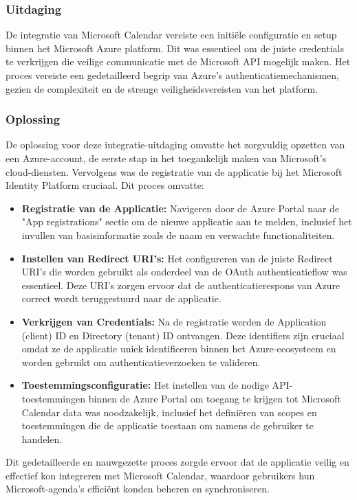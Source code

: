 \subsubsection{Uitdaging}
De integratie van Microsoft Calendar vereiste een initiële configuratie en setup binnen het Microsoft Azure platform. Dit was essentieel om de juiste credentials te verkrijgen die veilige communicatie met de Microsoft API mogelijk maken. Het proces vereiste een gedetailleerd begrip van Azure's authenticatiemechanismen, gezien de complexiteit en de strenge veiligheidsvereisten van het platform.

\subsubsection{Oplossing}
De oplossing voor deze integratie-uitdaging omvatte het zorgvuldig opzetten van een Azure-account, de eerste stap in het toegankelijk maken van Microsoft's cloud-diensten. Vervolgens was de registratie van de applicatie bij het Microsoft Identity Platform cruciaal. Dit proces omvatte:
\begin{itemize}
    \item \textbf{Registratie van de Applicatie:} Navigeren door de Azure Portal naar de "App registrations" sectie om de nieuwe applicatie aan te melden, inclusief het invullen van basisinformatie zoals de naam en verwachte functionaliteiten.
    \item \textbf{Instellen van Redirect URI's:} Het configureren van de juiste Redirect URI's die worden gebruikt als onderdeel van de OAuth authenticatieflow was essentieel. Deze URI's zorgen ervoor dat de authenticatierespons van Azure correct wordt teruggestuurd naar de applicatie.
    \item \textbf{Verkrijgen van Credentials:} Na de registratie werden de Application (client) ID en Directory (tenant) ID ontvangen. Deze identifiers zijn cruciaal omdat ze de applicatie uniek identificeren binnen het Azure-ecosysteem en worden gebruikt om authenticatieverzoeken te valideren.
    \item \textbf{Toestemmingsconfiguratie:} Het instellen van de nodige API-toestemmingen binnen de Azure Portal om toegang te krijgen tot Microsoft Calendar data was noodzakelijk, inclusief het definiëren van scopes en toestemmingen die de applicatie toestaan om namens de gebruiker te handelen.
\end{itemize}
Dit gedetailleerde en nauwgezette proces zorgde ervoor dat de applicatie veilig en effectief kon integreren met Microsoft Calendar, waardoor gebruikers hun Microsoft-agenda's efficiënt konden beheren en synchroniseren.

